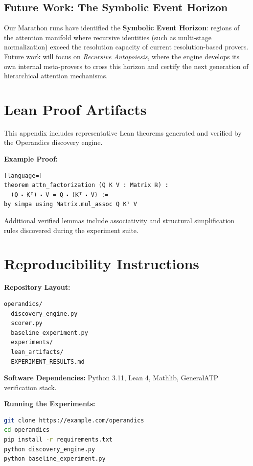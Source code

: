 \documentclass[11pt,a4paper,twocolumn]{article}
\theoremstyle{definition}
\theoremstyle{remark}
\begin{document}
\subsection{Future Work: The Symbolic Event Horizon}
Our Marathon runs have identified the \textbf{Symbolic Event Horizon}: 
regions of the attention manifold where recursive identities (such as 
multi-stage normalization) exceed the resolution capacity of current 
resolution-based provers. Future work will focus on \emph{Recursive Autopoiesis}, where the engine develops its own internal meta-provers to cross 
this horizon and certify the next generation of hierarchical attention 
mechanisms.

\appendix

\section{Lean Proof Artifacts}
\label{app:lean}
This appendix includes representative Lean theorems generated and verified by the Operandics discovery engine.

\textbf{Example Proof:}
\begin{lstlisting}[language=]
theorem attn_factorization (Q K V : Matrix ℝ) :
  (Q ⬝ Kᵀ) ⬝ V = Q ⬝ (Kᵀ ⬝ V) :=
by simpa using Matrix.mul_assoc Q Kᵀ V
\end{lstlisting}
Additional verified lemmas include associativity and structural simplification rules discovered during the experiment suite.

\section{Reproducibility Instructions}
\label{app:repro}
\textbf{Repository Layout:}
\begin{verbatim}
operandics/
  discovery_engine.py
  scorer.py
  baseline_experiment.py
  experiments/
  lean_artifacts/
  EXPERIMENT_RESULTS.md
\end{verbatim}

\textbf{Software Dependencies:}
Python 3.11, Lean 4, Mathlib, GeneralATP verification stack.

\textbf{Running the Experiments:}
\begin{lstlisting}[language=bash]
git clone https://example.com/operandics
cd operandics
pip install -r requirements.txt
python discovery_engine.py
python baseline_experiment.py
\end{lstlisting}
\end{document}
